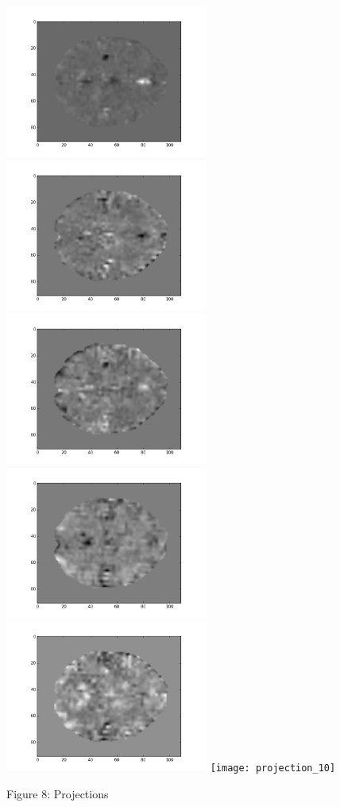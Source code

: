 \documentclass[12pt]{article}
\begin{document}
\begin{housevseverything}
      \includegraphics[width=0.5\textwidth]{projection_5}
      \includegraphics[width=0.5\textwidth]{projection_6}
      \includegraphics[width=0.5\textwidth]{projection_7}
      \includegraphics[width=0.5\textwidth]{projection_8}
      \includegraphics[width=0.5\textwidth]{projection_9}
      \texttt{[image: projection\_10]}
    \caption{Figure 8: Projections}
\end{housevseverything}
\end{document}
